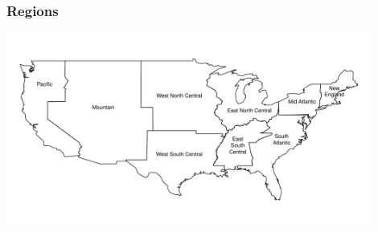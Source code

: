\documentclass[t]{beamer}\usepackage[]{graphicx}\usepackage[]{color}
\newenvironment{knitrout}{}{} %
\begin{document}
\begin{frame}
{\begin{center}
\begin{knitrout}
{}



\end{knitrout}

\end{center}
}

\end{frame}




\begin{frame}[label=regions]
\frametitle{Regions}

\vfill
\begin{center}
\includegraphics[width=0.9\textwidth]{figs/pm_regions.pdf}
\end{center}
\vfill

\hyperlink{pm_results}{}

\end{frame}
\end{document}
